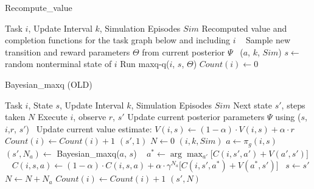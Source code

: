 \begin{algorithm}[t]
\caption{{\sc Recompute\_value}} \label{alg:recompvalue}
\begin{algorithmic}[1]
\REQUIRE Task $i$, Update Interval $k$, Simulation Episodes $Sim$
\ENSURE Recomputed value and completion functions for the task graph below and including $i$
\RETURN~\label{line:checkk}
\ENDIF
{}  
\STATE Sample new transition and reward parameters $\Theta$ from
current posterior $\Psi$~\label{line:sample}
\ELSE
{}
($a$, $k$, $Sim$)
\ENDFOR
{}
\STATE $s \leftarrow$ random nonterminal state of $i$
\STATE Run {\sc maxq-q}($i$, $s$, $\Theta$) 
\ENDFOR
\ENDIF
\STATE $Count(i) \leftarrow 0$
\end{algorithmic}
\end{algorithm} 

 \begin{algorithm}[t]
 \caption{{\sc Bayesian\_maxq} (OLD)} \label{alg:bmaxq}
 \begin{algorithmic}[1]
 \REQUIRE Task $i$, State $s$, Update Interval $k$, Simulation Episodes $Sim$
 \ENSURE Next state $s'$, steps taken $N$
 \STATE Execute $i$, observe $r$, $s'$
 \STATE Update current posterior parameters $\Psi$ using ($s$, $i$,$r$, $s'$)~\label{line:update}
 \STATE Update current value estimate: $V(i,s) \leftarrow (1-\alpha)\cdot V(i,s)+\alpha\cdot r$
 \STATE $Count(i) \leftarrow Count(i)+1$
 \RETURN $(s', 1)$
 \ELSE 
 \STATE $N \leftarrow 0$ 
 $(i, k, Sim)$
 \STATE $a\leftarrow \pi_{g}(i, s)$ 
 \STATE $(s', N_a)\leftarrow$ {\sc Bayesian\_maxq}($a$, $s$) ~\label{line:recursive}
 \STATE $a^*\leftarrow \arg\max_{a'}\bigl[C(i,s',a')+V(a',s')\bigr]$ ~\label{line:comp1}
 \STATE $C(i,s,a)\leftarrow(1-\alpha)\cdot C(i,s,a) + \alpha\cdot \gamma^{N_a}\bigl[C(i,s',a^*)+V(a^*,s') \bigr]$~\label{line:comp2}
 \STATE $s\leftarrow s'$
 \STATE $N\leftarrow N+N_a$
 \STATE $Count(i) \leftarrow Count(i)+1$
 \ENDWHILE
 \RETURN $(s', N)$
 \ENDIF
 \end{algorithmic}
 \end{algorithm} 

